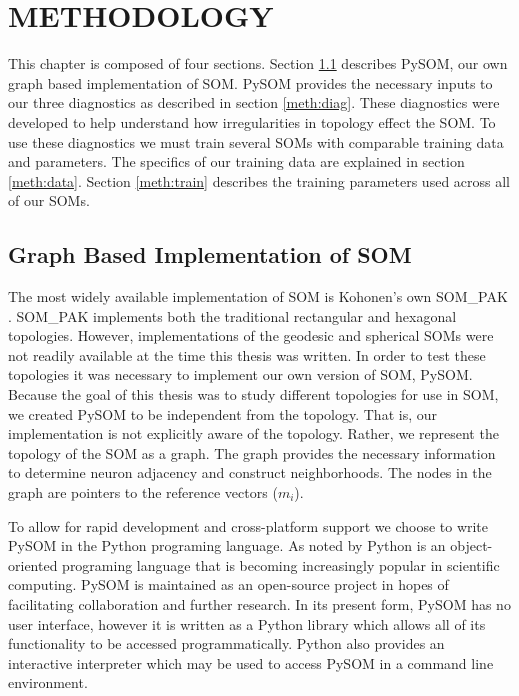 \chapter{METHODOLOGY}
This chapter is composed of four sections.
Section \ref{meth:som} describes PySOM, our own graph based implementation of
SOM. PySOM provides the necessary inputs to our three diagnostics as described
in section \ref{meth:diag}.  These diagnostics were developed to help
understand how irregularities in topology effect the SOM. To use these
diagnostics we must train several SOMs with comparable training data and
parameters.  The specifics of our training data are explained in section
\ref{meth:data}.  Section \ref{meth:train} describes the training parameters used
across all of our SOMs.

\section{Graph Based Implementation of SOM}
\label{meth:som}
The most widely available implementation of SOM is Kohonen's
own SOM\_PAK \citep{kohonen1996}.  SOM\_PAK implements both the traditional
rectangular and hexagonal topologies.  However, implementations of the
geodesic and spherical SOMs were not readily available at the time this thesis
was written.  In order to test these topologies it was necessary to implement
our own version of SOM, PySOM.  Because the goal of this thesis was to study
different topologies for use in SOM, we created PySOM to be independent from
the topology.
That is, our implementation is not explicitly aware of the topology.  Rather, we
represent the topology of the SOM as a graph. The graph provides the necessary
information to determine neuron adjacency and construct neighborhoods.  The
nodes in the graph are pointers to the reference vectors ($m_i$).

To allow for rapid development and cross-platform support we choose to write PySOM
in the Python programing language. As noted by \cite{Rey2006} Python is an
object-oriented programing language that is becoming increasingly popular in
scientific computing. PySOM is maintained as an open-source project in hopes
of facilitating collaboration and further research.  In its present form,
PySOM has no user interface, however it is written as a Python library which
allows all of its functionality to be accessed programmatically. %
Python also provides an interactive interpreter which may be used to access
PySOM in a command line environment.

